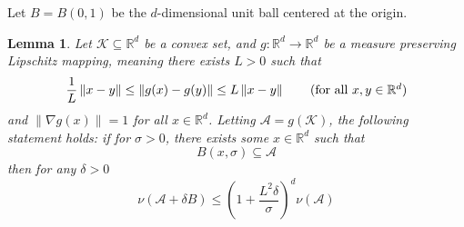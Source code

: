 \documentclass{article}
\newcommand{\Reals}{\mathbb{R}}
\newcommand{\norm}[1]{\left\lVert#1\right\rVert}
\newcommand{\Rd}{\Reals^d}
\newcommand{\1}{\mathbf{1}}
\theoremstyle{alden}
\theoremstyle{aldenthm}
\newtheorem{lemma}{Lemma}
\theoremstyle{remark}
\begin{document}
Let $B = B(0,1)$ be the $d$-dimensional unit ball centered at the origin.

\begin{lemma}
	\label{lem: expansion_sets}
	Let $\mathcal{K} \subseteq \Reals^d$ be a convex set, and $g: \Reals^d \to \Reals^d$ be a measure preserving Lipschitz mapping, meaning there exists $ L > 0$ such that
	\begin{equation*}
	\frac{1}{L} \norm{x - y} \leq \norm{g(x) - g(y)} \leq L \norm{x - y} \tag{for all $x,y \in \Reals^d$}
	\end{equation*}
	and $\norm{\nabla g (x)} = 1$ for all $x \in \Reals^d$. Letting $\mathcal{A} = g(\mathcal{K})$, the following statement holds: if for $\sigma > 0$, there exists some $x \in \Rd$ such that 
	\begin{equation}
	\label{eqn: expansion_sets}
	B(x,\sigma) \subseteq \mathcal{A} 
	\end{equation}
	then for any $\delta > 0$
	\begin{equation*}
	\nu(\mathcal{A} + \delta B) \leq \left(1 + \frac{L^2 \delta}{\sigma}\right)^d \nu(\mathcal{A})
	\end{equation*}
\end{lemma}
\end{document}
